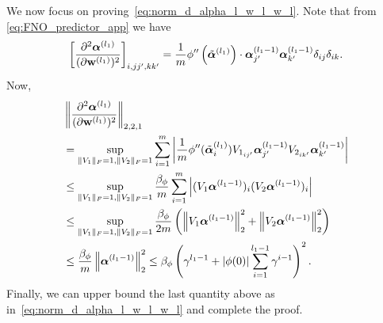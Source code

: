 We now focus on proving~\eqref{eq:norm_d_alpha_l_w_l_w_l}. Note that from \eqref{eq:FNO_predictor_app} we have
    \begin{align*}
        \left[\frac{\partial^2 \boldsymbol{\alpha}^{\left(l_1\right)}}{(\partial \mathbf{w}^{\left(l_1\right)})^2}\right]_{i,jj',kk'}
        =
        \frac{1}{m} \phi^{\prime \prime}
        \left(\tilde{\boldsymbol{\alpha}}^{\left(l_1\right)}\right) \cdot \boldsymbol{\alpha}_{j^{\prime}}^{\left(l_1 - 1\right)}
        \boldsymbol{\alpha}_{k^{\prime}}^{\left(l_1 - 1\right)}
        \delta_{i j}\delta_{ik}.
    \end{align*}
Now,
    \begin{align}
        \begin{aligned}
            &\left\| 
                \frac{\partial^2 \boldsymbol{\alpha}^{\left(l_1\right)}}{(\partial \mathbf{w}^{\left(l_1\right)})^2}
            \right\|_{2,2,1} \\
            &= 
            \sup_{\|V_1\|_F = 1, \|V_2\|_F = 1} \sum_{i=1}^m
            \left| 
                \frac{1}{m} \phi^{\prime \prime}(\tilde{\boldsymbol{\alpha}}^{(l_1)}_i) 
                V_{1_{i j^{\prime}}}\boldsymbol{\alpha}_{j^{\prime}}^{\left(l_1 -1\right)}
                V_{2_{i k^{\prime}}}\boldsymbol{\alpha}_{k^{\prime}}^{\left(l_1 -1\right)} 
            \right| \\ 
            &\leq
            \sup_{\|V_1\|_F = 1, \|V_2\|_F = 1}
            \frac{\beta_\phi}{m}
            \sum^m_{i=1}
            \left| 
            (V_1 \boldsymbol{\alpha}^{(l_1-1)})_i(V_2\boldsymbol{\alpha}^{(l_1-1)})_i \right| 
            \\
            &\leq
            \sup_{\|V_1\|_F = 1, \|V_2\|_F = 1}
            \frac{\beta_{\phi}}{2m} \left(\left\|V_1 \boldsymbol{\alpha}^{\left(l_1 - 1\right)}\right\|_2^2+\left\|V_2\boldsymbol{\alpha}^{(l_1-1)}\right\|_2^2\right) \\
            &\leq
            \frac{\beta_{\phi}}{m}\left\|\boldsymbol{\alpha}^{\left(l_1 - 1\right)}\right\|_2^2 \leq \beta_{\phi}
                \left(\gamma^{l_1-1}+|\phi(0)| \sum_{i=1}^{l_1-1} \gamma^{i-1}\right)^2.
        \end{aligned}
    \end{align}
Finally, we can upper bound the last quantity above as in~\eqref{eq:norm_d_alpha_l_w_l_w_l} and complete the proof.

